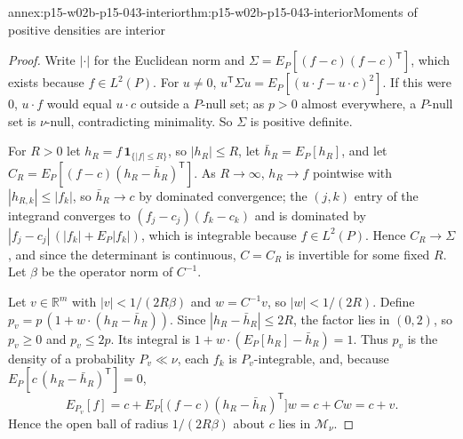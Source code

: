 \begin{annexitem}{annex:p15-w02b-p15-043-interior}{thm:p15-w02b-p15-043-interior}{Moments of positive densities are interior}
\begin{proof}
Write \(|\cdot|\) for the Euclidean norm and \(\Sigma=E_P[(f-c)(f-c)^{\mathsf T}]\),
which exists because \(f\in L^2(P)\). For \(u\neq0\),
\(u^{\mathsf T}\Sigma u=E_P[(u\cdot f-u\cdot c)^2]\). If this were \(0\),
\(u\cdot f\) would equal \(u\cdot c\) outside a \(P\)-null set; as \(p>0\)
almost everywhere, a \(P\)-null set is \(\nu\)-null, contradicting minimality.
So \(\Sigma\) is positive definite.

For \(R>0\) let \(h_R=f\,\mathbf 1_{\{|f|\leq R\}}\), so \(|h_R|\leq R\), let
\(\bar h_R=E_P[h_R]\), and let \(C_R=E_P[(f-c)(h_R-\bar h_R)^{\mathsf T}]\). As
\(R\to\infty\), \(h_R\to f\) pointwise with \(|h_{R,k}|\leq|f_k|\), so
\(\bar h_R\to c\) by dominated convergence; the \((j,k)\) entry of the integrand
converges to \((f_j-c_j)(f_k-c_k)\) and is dominated by
\(|f_j-c_j|\,(|f_k|+E_P|f_k|)\), which is integrable because \(f\in L^2(P)\).
Hence \(C_R\to\Sigma\), and since the determinant is continuous, \(C=C_R\) is
invertible for some fixed \(R\). Let \(\beta\) be the operator norm of \(C^{-1}\).

Let \(v\in\mathbb R^m\) with \(|v|<1/(2R\beta)\) and \(w=C^{-1}v\), so
\(|w|<1/(2R)\). Define \(p_v=p\,(1+w\cdot(h_R-\bar h_R))\). Since
\(|h_R-\bar h_R|\leq2R\), the factor lies in \((0,2)\), so \(p_v\geq0\) and
\(p_v\leq2p\). Its integral is \(1+w\cdot(E_P[h_R]-\bar h_R)=1\). Thus \(p_v\)
is the density of a probability \(P_v\ll\nu\), each \(f_k\) is
\(P_v\)-integrable, and, because \(E_P[c\,(h_R-\bar h_R)^{\mathsf T}]=0\),
\[
 E_{P_v}[f]=c+E_P\bigl[(f-c)(h_R-\bar h_R)^{\mathsf T}\bigr]w=c+Cw=c+v .
\]
Hence the open ball of radius \(1/(2R\beta)\) about \(c\) lies in
\(\mathcal M_\nu\).
\end{proof}
\end{annexitem}

